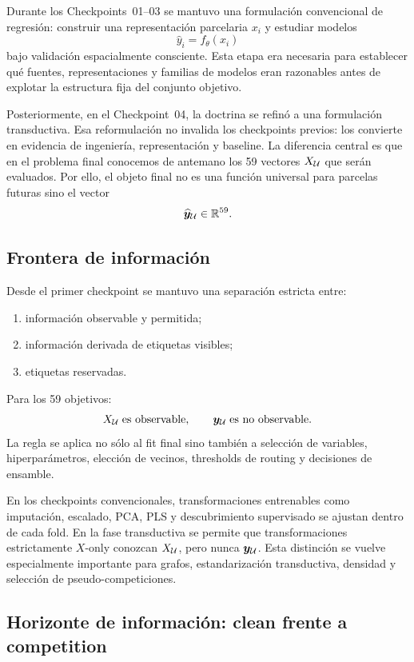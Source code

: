 Durante los Checkpoints~01--03 se mantuvo una formulación convencional de regresión:
construir una representación parcelaria $x_i$ y estudiar modelos
\[
\hat y_i=f_\theta(x_i)
\]
bajo validación espacialmente consciente. Esta etapa era necesaria para establecer qué
fuentes, representaciones y familias de modelos eran razonables antes de explotar la
estructura fija del conjunto objetivo.

Posteriormente, en el Checkpoint~04, la doctrina se refinó a una formulación
transductiva. Esa reformulación no invalida los checkpoints previos: los convierte en
evidencia de ingeniería, representación y baseline. La diferencia central es que en el
problema final conocemos de antemano los 59 vectores $X_{\mathcal{U}}$ que serán evaluados. Por
ello, el objeto final no es una función universal para parcelas futuras sino el vector
\[
\widehat{\bm y}_{\mathcal{U}}\in\mathbb{R}^{59}.
\]

\subsection{Frontera de información}

Desde el primer checkpoint se mantuvo una separación estricta entre:
\begin{enumerate}
\item información observable y permitida;
\item información derivada de etiquetas visibles;
\item etiquetas reservadas.
\end{enumerate}

Para los 59 objetivos:
\[
X_{\mathcal{U}}\;\text{es observable},\qquad
\bm y_{\mathcal{U}}\;\text{es no observable}.
\]
La regla se aplica no sólo al fit final sino también a selección de variables,
hiperparámetros, elección de vecinos, thresholds de routing y decisiones de ensamble.

En los checkpoints convencionales, transformaciones entrenables como imputación, escalado,
PCA, PLS y descubrimiento supervisado se ajustan dentro de cada fold. En la fase transductiva
se permite que transformaciones estrictamente $X$-only conozcan $X_{\mathcal{U}}$, pero nunca
$\bm y_{\mathcal{U}}$. Esta distinción se vuelve especialmente importante para grafos,
estandarización transductiva, densidad y selección de pseudo-competiciones.

\subsection{Horizonte de información: clean frente a competition}

